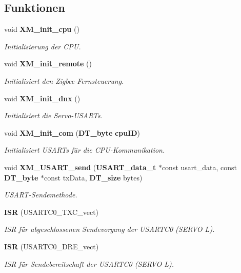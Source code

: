 \subsection*{Funktionen}
\begin{DoxyCompactItemize}
\item 
void {\bf XM\_\-init\_\-cpu} ()
\begin{DoxyCompactList}\small\item\em Initialisierung der CPU. \item\end{DoxyCompactList}\item 
void {\bf XM\_\-init\_\-remote} ()
\begin{DoxyCompactList}\small\item\em Initialisiert den Zigbee-\/Fernsteuerung. \item\end{DoxyCompactList}\item 
void {\bf XM\_\-init\_\-dnx} ()
\begin{DoxyCompactList}\small\item\em Initialisiert die Servo-\/USARTs. \item\end{DoxyCompactList}\item 
void {\bf XM\_\-init\_\-com} ({\bf DT\_\-byte} {\bf cpuID})
\begin{DoxyCompactList}\small\item\em Initialisiert USARTs für die CPU-\/Kommunikation. \item\end{DoxyCompactList}\item 
void {\bf XM\_\-USART\_\-send} ({\bf USART\_\-data\_\-t} $\ast$const usart\_\-data, const {\bf DT\_\-byte} $\ast$const txData, {\bf DT\_\-size} bytes)
\begin{DoxyCompactList}\small\item\em USART-\/Sendemethode. \item\end{DoxyCompactList}\item 
{\bf ISR} (USARTC0\_\-TXC\_\-vect)
\begin{DoxyCompactList}\small\item\em ISR für abgeschlossenen Sendevorgang der USARTC0 (SERVO L). \item\end{DoxyCompactList}\item 
{\bf ISR} (USARTC0\_\-DRE\_\-vect)
\begin{DoxyCompactList}\small\item\em ISR für Sendebereitschaft der USARTC0 (SERVO L). \item\end{DoxyCompactList}\item 

\end{DoxyCompactItemize}
